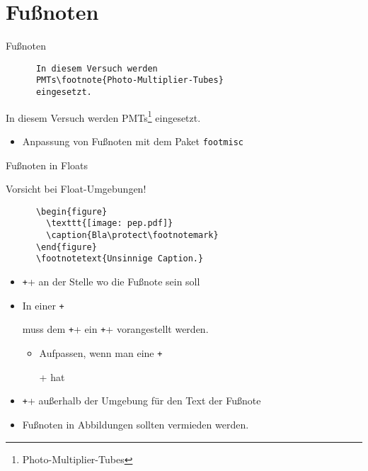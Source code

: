\section{Fußnoten}

\begin{frame}[fragile]{Fußnoten}
  \begin{CodeExample}{0.5}
    \begin{verbatim}
      In diesem Versuch werden
      PMTs\footnote{Photo-Multiplier-Tubes}
      eingesetzt.
    \end{verbatim}
    \CodeResult
      In diesem Versuch werden
      PMTs\footnote{\rmfamily Photo-Multiplier-Tubes}
      eingesetzt.
    \vspace{4cm}
  \end{CodeExample}
  \begin{itemize}
    \item Anpassung von Fußnoten mit dem Paket \texttt{footmisc}
  \end{itemize}
\end{frame}

\begin{frame}[fragile]{Fußnoten in Floats}
  \begin{alertblock}{Vorsicht bei Float-Umgebungen!}
    \begin{verbatim}
      \begin{figure}
        \texttt{[image: pep.pdf]}
        \caption{Bla\protect\footnotemark}
      \end{figure}
      \footnotetext{Unsinnige Caption.}
    \end{verbatim}
  \end{alertblock}
  \vspace{-1pt}
  \begin{itemize}
    \item \texttt+\footnotemark+ an der Stelle wo die Fußnote sein soll
    \item In einer \texttt+\caption+ muss dem \texttt+\footnotemark+ ein \texttt+\protect+ vorangestellt werden.
      \begin{itemize}
        \item Aufpassen, wenn man eine \texttt+\listoffigures+ hat
      \end{itemize}
    \item \texttt++ außerhalb der Umgebung für den Text der Fußnote
    \item Fußnoten in Abbildungen sollten vermieden werden.
  \end{itemize}
\end{frame}
